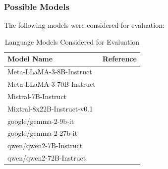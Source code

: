 \subsubsection*{Possible Models}
\label{sss:possible_models}
The following models were considered for evaluation:
\begin{table}[ht]
    \centering
    \begin{tabular}{
        >{\raggedright\arraybackslash}p{5cm}
        >{\arraybackslash}p{4.5cm}
        }
        \toprule
        \textbf{Model Name} & \textbf{Reference} \\
        \midrule
        Meta-LLaMA-3-8B-Instruct & \cite{LLaMA3} \\
        \midrule
        Meta-LLaMA-3-70B-Instruct & \cite{LLaMA3} \\
        \midrule
        Mistral-7B-Instruct & \cite{Jiang2023} \\
        \midrule
        Mixtral-8x22B-Instruct-v0.1 & \cite{Jiang2023} \\
        \midrule
        google/gemma-2-9b-it & \cite{GemmaTeam2024} \\
        \midrule
        google/gemma-2-27b-it & \cite{GemmaTeam2024} \\
        \midrule
        qwen/qwen2-7B-Instruct & \cite{Yang2024} \\
        \midrule
        qwen/qwen2-72B-Instruct & \cite{Yang2024} \\
        \bottomrule
    \end{tabular}
    \caption{Language Models Considered for Evaluation}
    \label{tab:llm_models}
\end{table}

